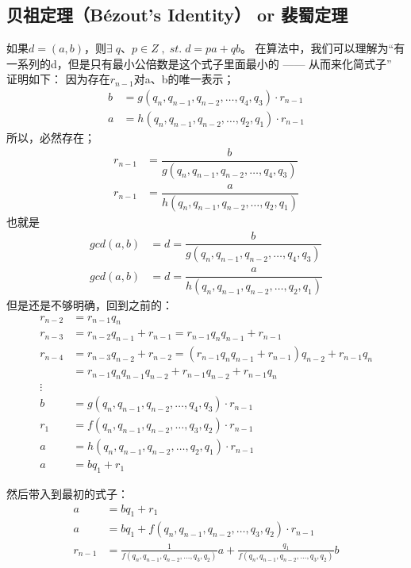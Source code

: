 \documentclass[12pt]{article}
\begin{document}
\subsection{贝祖定理（Bézout's Identity） or 裴蜀定理}
如果$d = (a,b)$，则$\exists\;q、p\in Z \;,\;st.\;d=pa+qb$。
在算法中，我们可以理解为“有一系列的d，但是只有最小公倍数是这个式子里面最小的 —— 从而来化简式子”
证明如下：
因为存在$r_{n-1}$对a、b的唯一表示；
\begin{align}
    b &= g(q_{n},q_{n-1},q_{n-2},\dots,q_{4},q_{3})\cdot r_{n-1}\\
    a &= h(q_{n},q_{n-1},q_{n-2},\dots,q_{2},q_{1})\cdot r_{n-1}
\end{align}
所以，必然存在；
\begin{align}
    r_{n-1} &= \dfrac{b}{g(q_{n},q_{n-1},q_{n-2},\dots,q_{4},q_{3})}\\
    r_{n-1} &= \dfrac{a}{h(q_{n},q_{n-1},q_{n-2},\dots,q_{2},q_{1})}
\end{align}
也就是
\begin{align}
    gcd(a,b) &= d = \dfrac{b}{g(q_{n},q_{n-1},q_{n-2},\dots,q_{4},q_{3})}\\
    gcd(a,b) &= d = \dfrac{a}{h(q_{n},q_{n-1},q_{n-2},\dots,q_{2},q_{1})}
\end{align}
但是还是不够明确，回到之前的：
\begin{align}
    r_{n-2} &= r_{n-1}q_{n}\\
    r_{n-3} &= r_{n-2}q_{n-1}+r_{n-1}=r_{n-1}q_{n}q_{n-1}+r_{n-1}\\
    r_{n-4} &= r_{n-3}q_{n-2}+r_{n-2}=(r_{n-1}q_{n}q_{n-1}+r_{n-1})q_{n-2}+r_{n-1}q_{n}\\ \nonumber
            &=r_{n-1}q_{n}q_{n-1}q_{n-2}+r_{n-1}q_{n-2}+r_{n-1}q_{n}\\
    \vdots\nonumber\\
    b &= g(q_{n},q_{n-1},q_{n-2},\dots,q_{4},q_{3})\cdot r_{n-1}\\
    r_{1} &= f(q_{n},q_{n-1},q_{n-2},\dots,q_{3},q_{2})\cdot r_{n-1}\\
    a &= h(q_{n},q_{n-1},q_{n-2},\dots,q_{2},q_{1})\cdot r_{n-1}\\
    a &=bq_{1}+r_{1}
\end{align}

然后带入到最初的式子：
\begin{align}
    a&=bq_{1}+r_{1}\\
    a&=bq_{1}+f(q_{n},q_{n-1},q_{n-2},\dots,q_{3},q_{2})\cdot r_{n-1}\\
    r_{n-1}&=\frac{1}{f(q_{n},q_{n-1},q_{n-2},\dots,q_{3},q_{2})}a+\frac{q_{1}}{f(q_{n},q_{n-1},q_{n-2},\dots,q_{3},q_{2})}b
\end{align}
\end{document}
